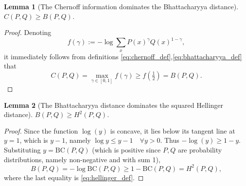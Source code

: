 \documentclass{article}
\newtheorem{lemma}{Lemma}
\begin{document}
\begin{lemma}[The Chernoff information dominates the Bhattacharyya distance]
\label{lem:chernoff_bhatt}
$C(P,Q) \geq B(P,Q)$.
\end{lemma}
\begin{proof}
Denoting \[f(\gamma):=-\log\sum_x P(x)^{\gamma}Q(x)^{1-\gamma},\] it immediately follows from definitions \eqref{eq:chernoff_def},\eqref{eq:bhattacharyya_def} that
\begin{equation}
    C(P,Q) = \max_{\gamma\in[0,1]}f(\gamma) \geq f(\tfrac{1}{2}) = B(P,Q).
    \label{eq:step1}
\end{equation}
\end{proof}
 
\begin{lemma}[The Bhattacharyya distance dominates the squared Hellinger distance]
\label{lem:bhatt_hellinger}
$B(P,Q) \geq H^{2}(P,Q)$.
\end{lemma}
\begin{proof}
Since the function $\log(y)$ is concave, it lies below its tangent line at $y=1$, which is $y-1$, namely $\log y \leq y -1 \quad \forall y>0$. Thus $-\log(y) \geq 1 - y$. Substituting $y = \mathrm{BC}(P,Q)$ (which is positive since $P,Q$ are probability distributions, namely non-negative and with sum 1),
\begin{equation}
    B(P,Q) = -\log \mathrm{BC}(P,Q) \geq 1 - \mathrm{BC}(P,Q) = H^{2}(P,Q),
\label{eq:step2}
\end{equation}
where the last equality is \eqref{eq:hellinger_def}.
\end{proof}
 
\end{document}

